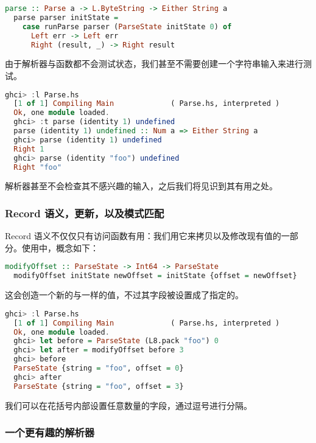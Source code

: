 \documentclass[./main.tex]{subfiles}
\begin{document}
\begin{lstlisting}[language=Haskell]
  parse :: Parse a -> L.ByteString -> Either String a
  parse parser initState =
    case runParse parser (ParseState initState 0) of
      Left err -> Left err
      Right (result, _) -> Right result
\end{lstlisting}

由于解析器与函数都不会测试状态，我们甚至不需要创建一个字符串输入来进行测试。

\begin{lstlisting}[language=Haskell]
  ghci> :l Parse.hs
  [1 of 1] Compiling Main             ( Parse.hs, interpreted )
  Ok, one module loaded.
  ghci> :t parse (identity 1) undefined
  parse (identity 1) undefined :: Num a => Either String a
  ghci> parse (identity 1) undefined
  Right 1
  ghci> parse (identity "foo") undefined
  Right "foo"
\end{lstlisting}

解析器甚至不会检查其不感兴趣的输入，之后我们将见识到其有用之处。

\subsubsection*{Record 语义，更新，以及模式匹配}

Record 语义不仅仅只有访问函数有用：我们用它来拷贝以及修改现有值的一部分。使用中，概念如下：

\begin{lstlisting}[language=Haskell]
  modifyOffset :: ParseState -> Int64 -> ParseState
  modifyOffset initState newOffset = initState {offset = newOffset}
\end{lstlisting}

这会创造一个新的与一样的值，不过其字段被设置成了指定的。

\begin{lstlisting}[language=Haskell]
  ghci> :l Parse.hs
  [1 of 1] Compiling Main             ( Parse.hs, interpreted )
  Ok, one module loaded.
  ghci> let before = ParseState (L8.pack "foo") 0
  ghci> let after = modifyOffset before 3
  ghci> before
  ParseState {string = "foo", offset = 0}
  ghci> after
  ParseState {string = "foo", offset = 3}
\end{lstlisting}

我们可以在花括号内部设置任意数量的字段，通过逗号进行分隔。

\subsubsection*{一个更有趣的解析器}
\end{document}
